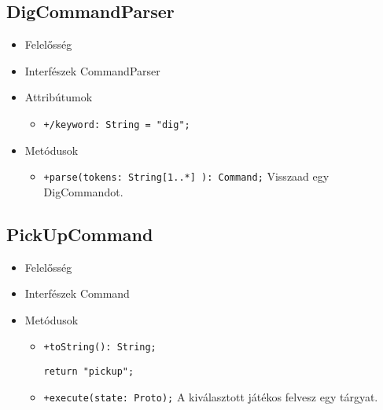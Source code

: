 \subsection{DigCommandParser}
\begin{itemize}
\item Felelősség\newline
\item Interfészek\newline
CommandParser
\item Attribútumok
	\begin{itemize}
		\item \texttt{+/keyword: String = "dig";}
	\end{itemize}
\item Metódusok
\begin{itemize}
		\item \texttt{+parse(tokens: String[1..*] ): Command;} \newline
		Visszaad egy DigCommandot.
	\end{itemize}
\end{itemize}

\subsection{PickUpCommand}
\begin{itemize}
\item Felelősség\newline
\item Interfészek\newline
Command
\item Metódusok
\begin{itemize}
		\item \texttt{+toString(): String;}
		\begin{lstlisting}
return "pickup";
		\end{lstlisting}
		\item \texttt{+execute(state: Proto);} \newline
		A kiválasztott játékos felvesz egy tárgyat.
	\end{itemize}
\end{itemize}
